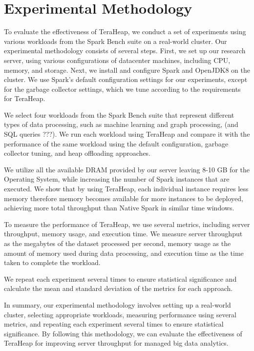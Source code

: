 \section{Experimental Methodology}
\label{sec:method}

To evaluate the effectiveness of TeraHeap, we conduct a
set of experiments using various workloads from the Spark Bench suite
on a real-world cluster. Our experimental methodology consists of
several steps. First, we set up our research server, using various
configurations of datacenter machines, including CPU, memory, and
storage. Next, we install and configure Spark and OpenJDK8 on the
cluster. We use Spark's default configuration settings for our
experiments, except for the garbage collector settings, which we tune
according to the requirements for TeraHeap.

We select four workloads from the Spark Bench suite that represent
different types of data processing, such as machine learning and graph
processing, (and SQL queries ???). We run each workload using TeraHeap
and compare it with the performance of the same
workload using the default configuration, garbage collector tuning,
and heap offloading approaches.

We utilize all the available DRAM provided by our server leaving 8-10
GB for the Operating System, while increasing the number of Spark
instances that are executed. We show that by using TeraHeap, each
individual instance requires less memory therefore memory becomes
available for more instances to be deployed, achieving more total
throughput than Native Spark in similar time windows.

To measure the performance of TeraHeap, we use several metrics,
including server throughput, memory usage, and execution time. We
measure server throughput as the megabytes of the dataset processed
per second, memory usage as the amount of memory used during data
processing, and execution time as the time taken to complete the
workload.

We repeat each experiment several times to ensure statistical
significance and calculate the mean and standard deviation of the
metrics for each approach.

In summary, our experimental methodology involves setting up a
real-world cluster, selecting appropriate workloads, measuring
performance using several metrics, and repeating each experiment
several times to ensure statistical significance. By following this
methodology, we can evaluate the effectiveness of TeraHeap
for improving server throughput for managed big data
analytics.

